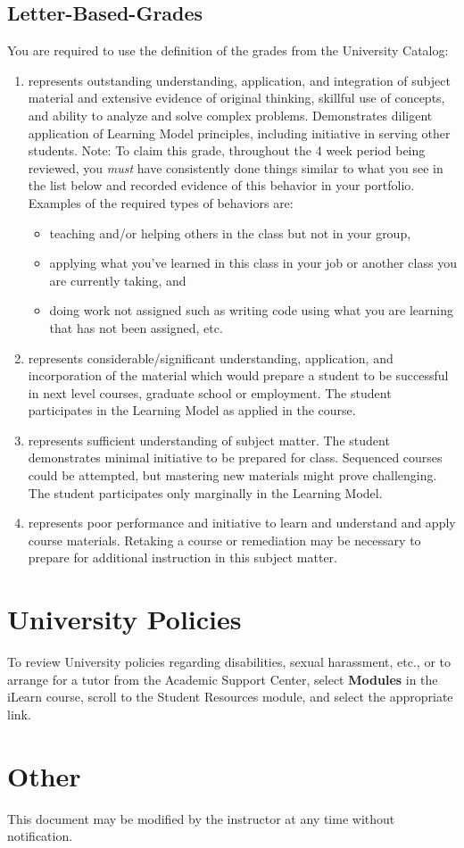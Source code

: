 \documentclass[12pt]{amsart}
\begin{document}
\subsection{Letter-Based-Grades}You are required to use the definition of the grades from the University Catalog:
\begin{enumerate}[label=\textbf{\Alph*}]
	\item represents outstanding understanding, application, and integration of subject material and extensive evidence of original thinking, skillful use of concepts, and ability to analyze and solve complex problems. Demonstrates diligent application of Learning Model principles, including initiative in serving other students.
	Note: To claim this grade, throughout the 4 week period being reviewed, you \textit{must} have consistently done things similar to what you see in the list below  and recorded evidence of this behavior in your portfolio. 
Examples of the required types of behaviors are:
\begin{itemize}  
\item teaching and/or helping others in the class but not in your group,
\item applying what you've learned in this class in your job or another class you are currently taking, and
\item doing work not assigned such as writing code using what you are learning that has not been assigned, etc.
\end{itemize}

	\item represents considerable/significant understanding, application, and incorporation of the material which would prepare a student to be successful in next level courses, graduate school or employment. The student participates in the Learning Model as applied in the course. 
	\item represents sufficient understanding of subject matter. The student demonstrates minimal initiative to be prepared for class. Sequenced courses could be attempted, but mastering new materials might prove challenging. The student participates only marginally in the Learning Model.
	\item represents poor performance and initiative to learn and understand and apply course materials. Retaking a course or remediation may be necessary to prepare for additional instruction in this subject matter. 
\end{enumerate}

\section{University Policies}
To review University policies regarding disabilities, sexual harassment, etc., or to arrange for a tutor from the Academic Support Center, select \textbf{Modules} in the iLearn course, scroll to the Student Resources module, and select the appropriate link.

\section{Other}
This document may be modified by the instructor at any time without notification.
\end{document}
